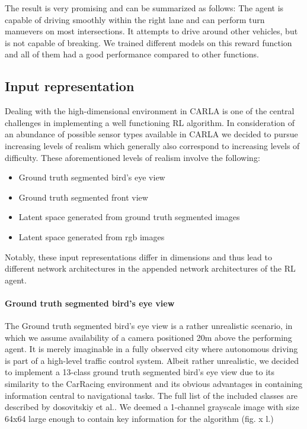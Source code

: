 \documentclass[letterpaper, 10 pt, conference]{ieeeconf}  %
\begin{document}
The result is very promising and can be summarized as follows: The agent is capable of driving smoothly within the right lane and can perform turn manuevers on most intersections. It attempts to drive around other vehicles, but is not capable of breaking. We trained different models on this reward function and all of them had a good performance compared to other functions.


\subsection{Input representation}
Dealing with the high-dimensional environment in CARLA is one of the central challenges in implementing a well functioning 
RL algorithm. In consideration of an abundance of possible sensor types available in CARLA we decided to pursue increasing
levels of realism which generally also correspond to increasing levels of difficulty. These aforementioned levels of realism involve the following:
\begin{itemize}
    \item Ground truth segmented bird's eye view
    \item Ground truth segmented front view
    \item Latent space generated from ground truth segmented images
    \item Latent space generated from rgb images
\end{itemize}
Notably, these input representations differ in dimensions and thus lead to different network architectures in the appended network architectures 
of the RL agent. 
\paragraph{Ground truth segmented bird's eye view}
The Ground truth segmented bird's eye view is a rather unrealistic scenario, in which we assume availability of a camera positioned 
20m above the performing agent. It is merely imaginable in a fully observed city where autonomous driving is part of a high-level traffic 
control system. Albeit rather unrealistic, we decided to implement a 13-class ground truth segmented bird's eye view due to its similarity to 
the CarRacing 
environment and its obvious advantages in containing information central to navigational tasks. The full list of the 
included classes are described by dosovitskiy et al.\cite{dosovitskiy2017carla}. We deemed a 1-channel 
grayscale image with size 64x64 
large enough to contain key information for the algorithm (fig. x l.)
\end{document}
